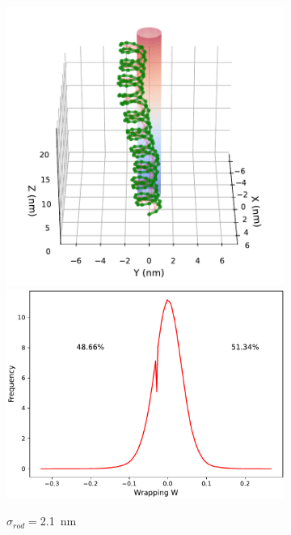 \documentclass[a4paper,10pt]{article}
\begin{document}
\begin{figure}[htbp]
\centering
\begin{subfigure}{.3\textwidth}
\includegraphics[width=\textwidth]{r1_A_2000000.pdf}
\includegraphics[width=\textwidth]{r1_A_wr_pr.pdf}
\caption{$\sigma_{rod}=$\SI{2.1}{\nm}}
\label{fig:r1_a}
\end{subfigure}
\begin{subfigure}{.3\textwidth}

\end{subfigure}
\end{figure}
\end{document}

